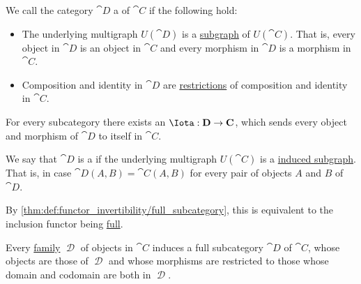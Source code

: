 \begin{definition}\label{def:subcategory}
  We call the category \( \cat{D} \) a  of \( \cat{C} \) if the following hold:
  \begin{itemize}
    \item The underlying multigraph \( U(\cat{D}) \) is a \hyperref[def:directed_multigraph/subgraph]{subgraph} of \( U(\cat{C}) \). That is, every object in \( \cat{D} \) is an object in \( \cat{C} \) and every morphism in \( \cat{D} \) is a morphism in \( \cat{C} \).
    \item Composition and identity in \( \cat{D} \) are \hyperref[def:set_valued_map/restriction]{restrictions} of composition and identity in \( \cat{C} \).
  \end{itemize}

  \begin{thmenum}
     For every subcategory there exists an  \( \Iota: \cat{D} \to \cat{C} \), which sends every object and morphism of \( \cat{D} \) to itself in \( \cat{C} \).

     We say that \( \cat{D} \) is a  if the underlying multigraph \( U(\cat{C}) \) is a \hyperref[def:induced_subgraph]{induced subgraph}. That is, in case \( \cat{D}(A, B) = \cat{C}(A, B) \) for every pair of objects \( A \) and \( B \) of \( \cat{D} \).

    By \cref{thm:def:functor_invertibility/full_subcategory}, this is equivalent to the inclusion functor being \hyperref[def:functor_invertibility/full]{full}.

     Every \hyperref[rem:family_of_sets]{family} \( \mscrD \) of objects in \( \cat{C} \) induces a full subcategory \( \cat{D} \) of \( \cat{C} \), whose objects are those of \( \mscrD \) and whose morphisms are restricted to those whose domain and codomain are both in \( \mscrD \).
  \end{thmenum}
\end{definition}

